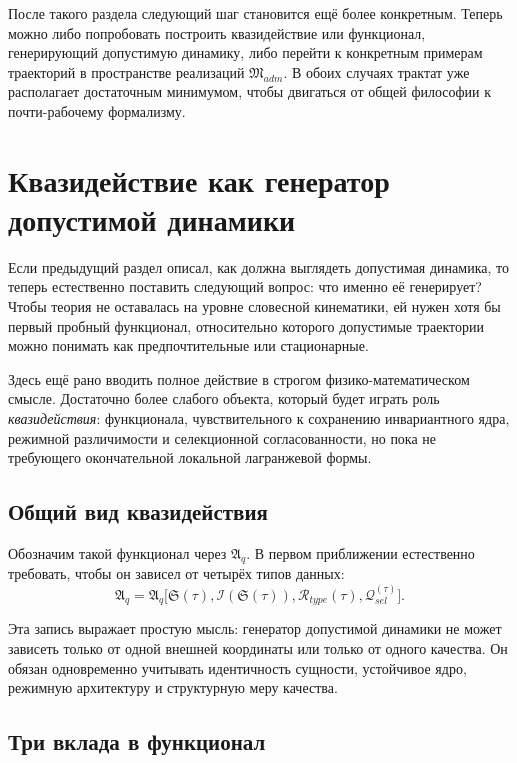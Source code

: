 \documentclass[12pt,a4paper]{article}
\begin{document}
После такого раздела следующий шаг становится ещё более конкретным. Теперь можно либо попробовать построить квазидействие или функционал, генерирующий допустимую динамику, либо перейти к конкретным примерам траекторий в пространстве реализаций \(\mathfrak{M}_{adm}\). В обоих случаях трактат уже располагает достаточным минимумом, чтобы двигаться от общей философии к почти-рабочему формализму.

\section{Квазидействие как генератор допустимой динамики}

Если предыдущий раздел описал, как должна выглядеть допустимая динамика, то теперь естественно поставить следующий вопрос: что именно её генерирует? Чтобы теория не оставалась на уровне словесной кинематики, ей нужен хотя бы первый пробный функционал, относительно которого допустимые траектории можно понимать как предпочтительные или стационарные.

Здесь ещё рано вводить полное действие в строгом физико-математическом смысле. Достаточно более слабого объекта, который будет играть роль \textit{квазидействия}: функционала, чувствительного к сохранению инвариантного ядра, режимной различимости и селекционной согласованности, но пока не требующего окончательной локальной лагранжевой формы.

\subsection{Общий вид квазидействия}

Обозначим такой функционал через \(\mathfrak{A}_{q}\). В первом приближении естественно требовать, чтобы он зависел от четырёх типов данных:
\begin{equation}
\mathfrak{A}_{q}=\mathfrak{A}_{q}\bigl[\mathfrak{S}(\tau),\mathcal{I}(\mathfrak{S}(\tau)),\mathcal{R}_{type}(\tau),\mathcal{Q}_{sel}^{(\tau)}\bigr].
\end{equation}

Эта запись выражает простую мысль: генератор допустимой динамики не может зависеть только от одной внешней координаты или только от одного качества. Он обязан одновременно учитывать идентичность сущности, устойчивое ядро, режимную архитектуру и структурную меру качества.

\subsection{Три вклада в функционал}
\end{document}

